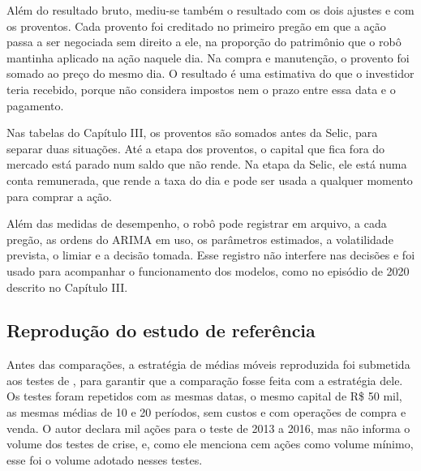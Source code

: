Além do resultado bruto, mediu-se também o resultado com os dois ajustes e
com os proventos. Cada provento foi creditado no primeiro pregão em que a ação
passa a ser negociada sem direito a ele, na proporção do patrimônio que o robô
mantinha aplicado na ação naquele dia. Na compra e manutenção, o provento foi
somado ao preço do mesmo dia. O resultado é uma estimativa do que o investidor
teria recebido, porque não considera impostos nem o prazo entre essa data e o
pagamento.

Nas tabelas do Capítulo III, os proventos são somados antes da Selic, para
separar duas situações. Até a etapa dos proventos, o capital que fica fora do
mercado está parado num saldo que não rende. Na etapa da Selic, ele está numa
conta remunerada, que rende a taxa do dia e pode ser usada a qualquer momento
para comprar a ação.

Além das medidas de desempenho, o robô pode registrar em arquivo, a cada pregão,
as ordens do ARIMA em uso, os parâmetros estimados, a volatilidade prevista, o
limiar e a decisão tomada. Esse registro não interfere nas decisões e foi usado
para acompanhar o funcionamento dos modelos, como no episódio de 2020 descrito
no Capítulo III.

\subsection{Reprodução do estudo de referência}

Antes das comparações, a estratégia de médias móveis reproduzida foi submetida aos
testes de , para garantir que a comparação fosse feita com
a estratégia dele. Os testes foram repetidos com as mesmas datas, o mesmo capital
de R\$ 50 mil, as mesmas médias de 10 e 20 períodos, sem custos e com operações de
compra e venda. O autor declara mil ações para o teste de 2013 a 2016, mas não
informa o volume dos testes de crise, e, como ele menciona cem ações como volume
mínimo, esse foi o volume adotado nesses testes.

